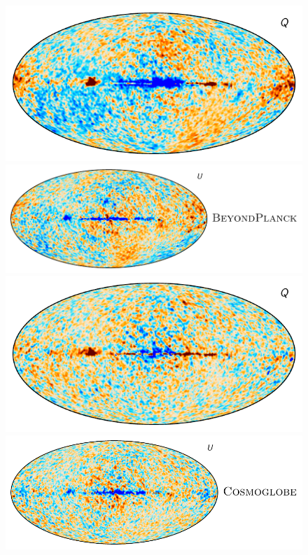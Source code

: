\documentclass[twocolumn]{../../common/aa}
\begin{document}
\begin{figure}
	\newline
	\includegraphics[height=0.15\textheight]{figures/diff_BP_DR5_Q.pdf}
	\includegraphics[height=0.15\textheight]{figures/diff_BP_DR5_U.pdf}
	\newline
	\includegraphics[height=0.15\textheight]{figures/diff_CG_Q.pdf}
	\includegraphics[height=0.15\textheight]{figures/diff_CG_U.pdf}\\

\end{figure}
\end{document}
